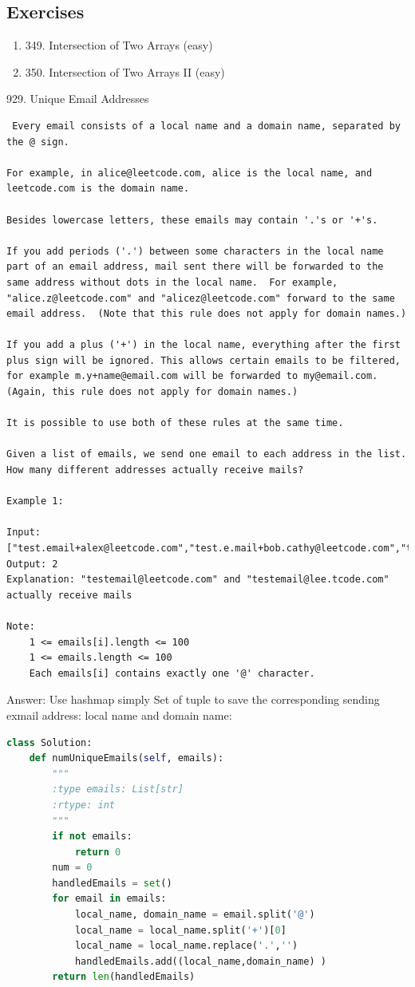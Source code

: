 \documentclass[../main.tex]{subfiles}
\begin{document}
\subsection{Exercises}
\begin{enumerate}
    \item 349. Intersection of Two Arrays (easy)
    \item 350. Intersection of Two Arrays II (easy)  
\end{enumerate}
 929. Unique Email Addresses
\begin{lstlisting}
 Every email consists of a local name and a domain name, separated by the @ sign.

For example, in alice@leetcode.com, alice is the local name, and leetcode.com is the domain name.

Besides lowercase letters, these emails may contain '.'s or '+'s.

If you add periods ('.') between some characters in the local name part of an email address, mail sent there will be forwarded to the same address without dots in the local name.  For example, "alice.z@leetcode.com" and "alicez@leetcode.com" forward to the same email address.  (Note that this rule does not apply for domain names.)

If you add a plus ('+') in the local name, everything after the first plus sign will be ignored. This allows certain emails to be filtered, for example m.y+name@email.com will be forwarded to my@email.com.  (Again, this rule does not apply for domain names.)

It is possible to use both of these rules at the same time.

Given a list of emails, we send one email to each address in the list.  How many different addresses actually receive mails? 

Example 1:

Input: ["test.email+alex@leetcode.com","test.e.mail+bob.cathy@leetcode.com","testemail+david@lee.tcode.com"]
Output: 2
Explanation: "testemail@leetcode.com" and "testemail@lee.tcode.com" actually receive mails

Note:
    1 <= emails[i].length <= 100
    1 <= emails.length <= 100
    Each emails[i] contains exactly one '@' character.
\end{lstlisting} 
Answer: Use hashmap simply Set of tuple to save the corresponding sending exmail address: local name and domain name:
\begin{lstlisting}[language=Python]
class Solution:
    def numUniqueEmails(self, emails):
        """
        :type emails: List[str]
        :rtype: int
        """
        if not emails:
            return 0
        num = 0
        handledEmails = set()
        for email in emails:
            local_name, domain_name = email.split('@')
            local_name = local_name.split('+')[0]
            local_name = local_name.replace('.','')
            handledEmails.add((local_name,domain_name) )
        return len(handledEmails)
\end{lstlisting}
\end{document}
